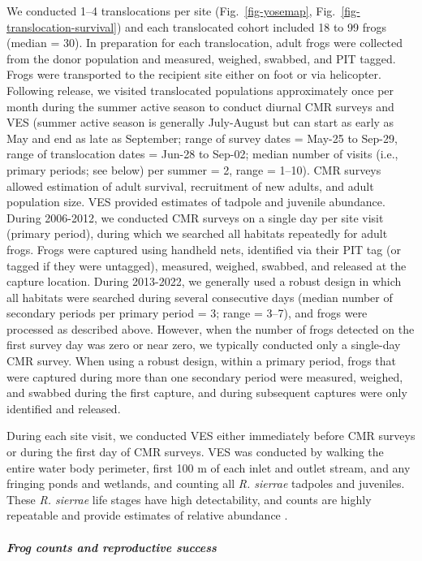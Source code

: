 \documentclass[
  letterpaper,
  DIV=11,
  numbers=noendperiod]{scrartcl}
\let\oldsubparagraph\subparagraph
\renewcommand{\subparagraph}[1]{\oldsubparagraph{#1}\mbox{}}
\begin{document}
We conducted 1--4 translocations per site (Fig.~\ref{fig-yosemap},
Fig.~\ref{fig-translocation-survival}) and each translocated cohort
included 18 to 99 frogs (median = 30). In preparation for each
translocation, adult frogs were collected from the donor population and
measured, weighed, swabbed, and PIT tagged. Frogs were transported to
the recipient site either on foot or via helicopter. Following release,
we visited translocated populations approximately once per month during
the summer active season to conduct diurnal CMR surveys and VES (summer
active season is generally July-August but can start as early as May and
end as late as September; range of survey dates = May-25 to Sep-29,
range of translocation dates = Jun-28 to Sep-02; median number of visits
(i.e., primary periods; see below) per summer = 2, range = 1--10). CMR
surveys allowed estimation of adult survival, recruitment of new adults,
and adult population size. VES provided estimates of tadpole and
juvenile abundance. During 2006-2012, we conducted CMR surveys on a
single day per site visit (primary period), during which we searched all
habitats repeatedly for adult frogs. Frogs were captured using handheld
nets, identified via their PIT tag (or tagged if they were untagged),
measured, weighed, swabbed, and released at the capture location. During
2013-2022, we generally used a robust design in which all habitats were
searched during several consecutive days (median number of secondary
periods per primary period = 3; range = 3--7), and frogs were processed
as described above. However, when the number of frogs detected on the
first survey day was zero or near zero, we typically conducted only a
single-day CMR survey. When using a robust design, within a primary
period, frogs that were captured during more than one secondary period
were measured, weighed, and swabbed during the first capture, and during
subsequent captures were only identified and released.

During each site visit, we conducted VES either immediately before CMR
surveys or during the first day of CMR surveys. VES was conducted by
walking the entire water body perimeter, first 100 m of each inlet and
outlet stream, and any fringing ponds and wetlands, and counting all
\emph{R. sierrae} tadpoles and juveniles. These \emph{R. sierrae} life
stages have high detectability, and counts are highly repeatable and
provide estimates of relative abundance \citep{knapp2000}.

\subparagraph{Frog counts and reproductive
success}\label{frog-counts-and-reproductive-success}
\end{document}
